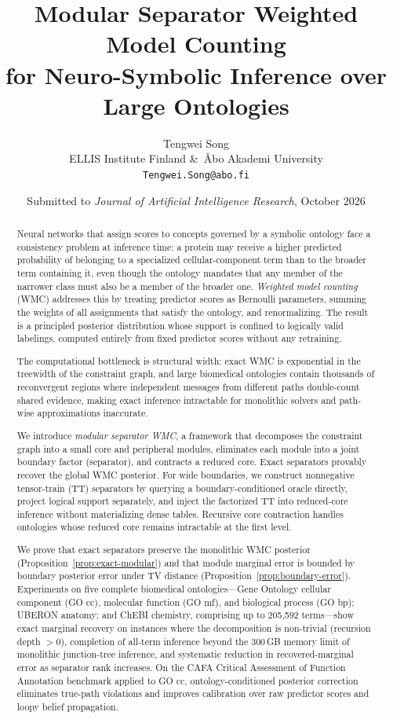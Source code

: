 \documentclass[12pt]{article}
\title{\textbf{Modular Separator Weighted Model Counting\\
for Neuro-Symbolic Inference over Large Ontologies}}
\author{
  Tengwei Song\\
  ELLIS Institute Finland \&\ \AA{}bo Akademi University\\
  \texttt{Tengwei.Song@abo.fi}
}
\date{Submitted to \textit{Journal of Artificial Intelligence Research}, October 2026}
\begin{document}
\maketitle
\thispagestyle{fancy}

\begin{abstract}
Neural networks that assign scores to concepts governed by a symbolic
ontology face a consistency problem at inference time: a protein may
receive a higher predicted probability of belonging to a specialized
cellular-component term than to the broader term containing it, even
though the ontology mandates that any member of the narrower class must
also be a member of the broader one. \emph{Weighted model counting}
(WMC) addresses this by treating predictor scores as Bernoulli
parameters, summing the weights of all assignments that satisfy the
ontology, and renormalizing. The result is a principled posterior
distribution whose support is confined to logically valid labelings,
computed entirely from fixed predictor scores without any retraining.

The computational bottleneck is structural width: exact WMC is
exponential in the treewidth of the constraint graph, and large
biomedical ontologies contain thousands of reconvergent regions where
independent messages from different paths double-count shared evidence,
making exact inference intractable for monolithic solvers and path-wise
approximations inaccurate.

We introduce \emph{modular separator WMC}, a framework that decomposes
the constraint graph into a small core and peripheral modules,
eliminates each module into a joint boundary factor (separator), and
contracts a reduced core. Exact separators provably recover the global
WMC posterior. For wide boundaries, we construct nonnegative
tensor-train (TT) separators by querying a boundary-conditioned oracle
directly, project logical support separately, and inject the factorized
TT into reduced-core inference without materializing dense tables.
Recursive core contraction handles ontologies whose reduced core remains
intractable at the first level.

We prove that exact separators preserve the monolithic WMC posterior
(Proposition~\ref{prop:exact-modular}) and that module marginal error
is bounded by boundary posterior error under TV distance
(Proposition~\ref{prop:boundary-error}). Experiments on five complete
biomedical ontologies---Gene Ontology cellular component (GO cc),
molecular function (GO mf), and biological process (GO bp); UBERON
anatomy; and ChEBI chemistry, comprising up to 205,592 terms---show
exact marginal recovery on instances where the decomposition is
non-trivial (recursion depth $>0$), completion of all-term inference
beyond the 300\,GB memory limit of monolithic junction-tree inference,
and systematic reduction in recovered-marginal error as separator rank
increases. On the CAFA Critical Assessment of Function Annotation
benchmark applied to GO cc, ontology-conditioned posterior correction
eliminates true-path violations and improves calibration over raw
predictor scores and loopy belief propagation.
\end{abstract}
\end{document}
